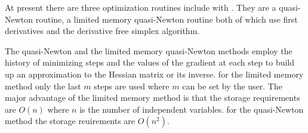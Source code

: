 %
%


At present there are three optimization routines include 
with \ADM. They are a quasi-Newton routine, a limited memory
quasi-Newton routine both of which use first derivatives 
and the derivative free simplex algorithm.  

The quasi-Newton  and the limited memory quasi-Newton
methods employ the history of minimizing steps and the
values of the gradient at each step to build up an 
approximation to the Hessian matrix or its inverse.
for the limited memory method only the last $m$ steps are
used where $m$ can be set by the user. The major advantage 
of the limited memory method is that the storage requirements
are $O(n)$ where $n$ is the number of independent variables.
for the quasi-Newton method the storage reuirements are
$O(n^2)$.
